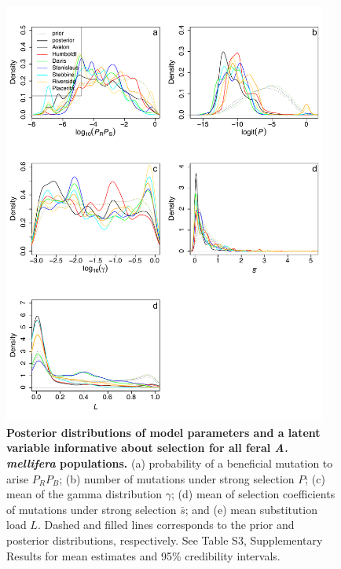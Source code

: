 \documentclass[a4paper, 12pt]{article}
\begin{document}
\begin{figure}[ht]
  \centering 
  \includegraphics[width=0.95\textwidth]{Figures/FigureS26_weighted_densityPlots_selection_feralbees.pdf}
  \small\caption{\textbf{Posterior distributions of model parameters and a latent variable informative about selection for all feral \textit{A. mellifera} populations.} (a) probability of a beneficial mutation to arise $P_RP_B$; (b) number of mutations under strong selection $P$; (c)  mean of the gamma distribution $\gamma$; (d) mean of selection coefficients of mutations under strong selection $\bar{s}$; and (e) mean substitution load $L$. Dashed and filled lines corresponds to the prior and posterior distributions, respectively. See Table S3, Supplementary Results for mean estimates and 95\% credibility intervals.}
  \label{fig:supple_feralbee_densityselection}
\end{figure}
\end{document}
